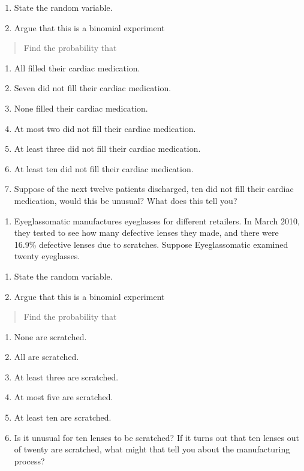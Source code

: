 \documentclass[]{book}
\providecommand{\tightlist}{%
  \setlength{\itemsep}{0pt}\setlength{\parskip}{0pt}}
\begin{document}
\begin{enumerate}
\def\labelenumi{\alph{enumi}.}
\item
  State the random variable.
\item
  Argue that this is a binomial experiment
\end{enumerate}

\begin{quote}
Find the probability that
\end{quote}

\begin{enumerate}
\def\labelenumi{\alph{enumi}.}
\setcounter{enumi}{2}
\item
  All filled their cardiac medication.
\item
  Seven did not fill their cardiac medication.
\item
  None filled their cardiac medication.
\item
  At most two did not fill their cardiac medication.
\item
  At least three did not fill their cardiac medication.
\item
  At least ten did not fill their cardiac medication.
\item
  Suppose of the next twelve patients discharged, ten did not fill
  their cardiac medication, would this be unusual? What does this tell
  you?
\end{enumerate}

\begin{enumerate}
\def\labelenumi{\arabic{enumi}.}
\setcounter{enumi}{8}
\tightlist
\item
  Eyeglassomatic manufactures eyeglasses for different retailers. In
  March 2010, they tested to see how many defective lenses they made,
  and there were 16.9\% defective lenses due to scratches. Suppose
  Eyeglassomatic examined twenty eyeglasses.
\end{enumerate}

\begin{enumerate}
\def\labelenumi{\alph{enumi}.}
\item
  State the random variable.
\item
  Argue that this is a binomial experiment
\end{enumerate}

\begin{quote}
Find the probability that
\end{quote}

\begin{enumerate}
\def\labelenumi{\alph{enumi}.}
\setcounter{enumi}{2}
\item
  None are scratched.
\item
  All are scratched.
\item
  At least three are scratched.
\item
  At most five are scratched.
\item
  At least ten are scratched.
\item
  Is it unusual for ten lenses to be scratched? If it turns out that
  ten lenses out of twenty are scratched, what might that tell you
  about the manufacturing process?
\end{enumerate}
\end{document}
